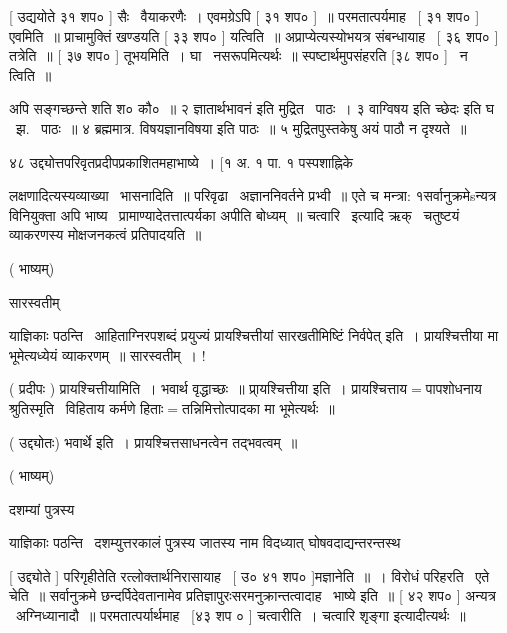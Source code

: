 \documentclass[11pt, openany]{book}
\begin{document}
 [ उद्ययोते ३१ शप० ] सैः \textendash\ वैयाकरणैः~। एवमग्रेऽपि [ ३१ शप० ]~॥
परमतात्पर्यमाह \textendash\ [ ३१ शप० ] एवमिति~॥ प्राचामुक्तिं खण्डयति [ ३३
शप० ] यत्विति~॥ अप्राप्येत्यस्योभयत्र संबन्धायाह \textendash\ [ ३६ शप० ]
तत्रेति~॥ [ ३७ शप० ] तूभयमिति~। घा \textendash\ नसरूपमित्यर्थः~॥
स्पष्टार्थमुपसंहरति [३८ शप० ] \textendash\ न त्विति~॥ 



{\qt अपि सङ्गच्छन्ते} शति श० कौ०~॥ २ {\qt ज्ञातार्थभावनं} इति मुद्रित \textendash\ पाठः~। ३
{\qt वाग्विषय इति च्छेदः} इति घ \textendash\ झ. \textendash\ पाठः~॥ ४ ब्रह्ममात्र. विषयज्ञानविषया
इति पाठः~॥ ५ मुद्रितपुस्तकेषु अयं पाठौ न दृश्यते~॥ 

४८ उद्द्योत्तपरिवृतप्रदीपप्रकाशितमहाभाष्ये~। [१ अ. १ पा. १
पस्पशाह्निके 



लक्षणादित्यस्यव्याख्या \textendash\ भासनादिति~॥ परिवृढा \textendash\ अज्ञाननिवर्तने प्रभ्वी~॥
एते च मन्त्रा: १सर्वानुक्रमेsन्यत्र विनियुक्ता अपि भाष्य \textendash\ 
प्रामाण्यादेतत्तात्पर्यका अपीति बोध्यम्~॥ {\qt  चत्वारि} \textendash\ इत्यादि ऋक् \textendash\ 
चतुष्टयं व्याकरणस्य मोक्षजनकत्वं प्रतिपादयति~॥ 

 ( भाष्यम्) 

 सारस्वतीम् \textendash\ 

 याज्ञिकाः पठन्ति \textendash\ {\qt आहिताग्निरपशब्दं प्रयुज्यं प्रायश्चित्तीयां
सारखतीमिष्टिं निर्वपेत्} इति~। प्रायश्चित्तीया मा भूमेत्यध्येयं
व्याकरणम्~॥ सारस्वतीम्~। ! 

 ( प्रदीपः ) प्रायश्चित्तीयामिति~। भवार्थ {\qt वृद्धाच्छः~॥}
प्रा्यश्चित्तीया इति~। प्रायश्चित्ताय$=$पापशोधनाय श्रुतिस्मृति \textendash\ विहिताय
कर्मणे हिताः$=$तन्निमित्तोत्पादका मा भूमेत्यर्थः~॥ 

 ( उद्द्योतः) भवार्थे इति~। प्रायश्चित्तसाधनत्वेन तद्भवत्वम्~॥ 

 ( भाष्यम्) 

 दशम्यां पुत्रस्य \textendash\ 

 याज्ञिकाः पठन्ति \textendash\ {\qt दशम्युत्तरकालं} पुत्रस्य जातस्य नाम विदध्यात्
घोषवदाद्यन्तरन्तस्थ \textendash\ 



 [ उद्द्योते ] परिगृहीतेति रत्लोक्तार्थनिरासायाह \textendash\ [ उ० ४१ शप०
]मज्ञानेति~॥~। विरोधं परिहरति \textendash\ एते चेति~॥ सर्वानुक्रमे
छन्दर्पिदेवतानामेव प्रतिज्ञापुरःसरमनुक्रान्तत्वादाह \textendash\ भाष्ये इति~॥ [
४२ शप० ] अन्यत्र \textendash\ अग्निध्यानादौ~॥ परमतात्पर्यार्थमाह \textendash\ [४३ शप ० ]
चत्वारीति~। चत्वारि शृङ्गा इत्यादीत्यर्थः~॥ 
\end{document}

